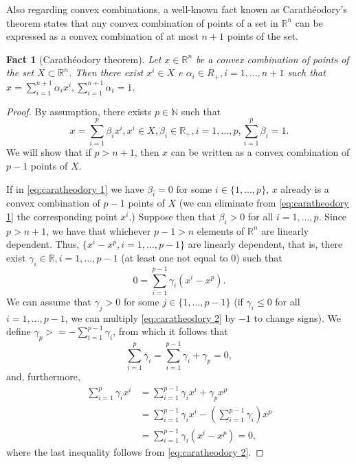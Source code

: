\documentclass[smallextended,numbook,nospthms]{svjour3}
\theoremstyle{plain}
\newtheorem{fact}[theorem]{Fact}
\theoremstyle{definition}
\def\RR{\mathds R}
\def\NN{\mathds N}
\begin{document}
Also regarding convex combinations, a well-known fact known as Carathéodory's theorem states that any convex combination of points of a set in $\RR^{n}$ can be expressed as a convex combination of at most $n+1$ points of the set.
\begin{fact}[Carathéodory theorem]\label{fact:caratheodory}
Let $x \in \RR^{n}$ be a convex combination of points of the set $X \subset \RR^{n}$. Then there exist $x^{i} \in X$ e $\alpha_{i} \in R_{+}, i=1, \ldots, n+1$
such that $x=\sum_{i=1}^{n+1} \alpha_{i} x^{i}, \sum_{i=1}^{n+1} \alpha_{i}=1$.
\end{fact}
\begin{proof}
	By assumption, there exists $p \in \NN$ such that
	\[
	x=\sum_{i=1}^{p} \beta_{i} x^{i}, x^{i} \in X, \beta_{i} \in \RR_{+}, i=1, \ldots, p, \sum_{i=1}^{p} \beta_{i}=1. \label{eq:caratheodory 1}
	\]
	We will show that if $p > n+1$, then $x$ can be written as a convex combination of $p-1$ points of $X$.
	
	If in \cref{eq:caratheodory 1} we have $\beta_{i}=0$ for some $i \in \{1,\ldots,p\}$, $x$ already is a convex combination of $p-1$ points of $X$ (we can eliminate from \cref{eq:caratheodory 1} the corresponding point $x^i$.) Suppose then that $\beta_{i}>0$ for all $i=1,\ldots,p$. Since $p>n+1$, we have that whichever $p-1>n$ elements of $\RR^n$ are linearly dependent. Thus, $\{x^i-x^p, i =1,\ldots,p-1\}$ are linearly dependent, that is, there exist $\gamma_{i} \in \RR, i=1,\ldots,p-1$ (at least one not equal to 0) such that
	\[
	0=\sum_{i=1}^{p-1} \gamma_{i}\left(x^{i}-x^{p}\right) \label{eq:caratheodory 2}.
	\]
	We can assume that $\gamma_{j}>0$ for some $j \in\{1, \ldots, p-1\}$ (if $\gamma_{i} \leq 0$ for all $i=1, \ldots, p-1$, we can multiply \cref{eq:caratheodory 2} by $-1$ to change signs). We define $\gamma_{p}>=-\sum_{i=1}^{p-1} \gamma_{i}$, from which it follows that
	\[
	\sum_{i=1}^{p} \gamma_{i}=\sum_{i=1}^{p-1} \gamma_{i}+\gamma_{p}=0, \label{eq:caratheodory 3}
	\]
	and, furthermore,
	\begin{align}
		\sum_{i=1}^{p} \gamma_{i} x^{i} &=\sum_{i=1}^{p-1} \gamma_{i} x^{i}+\gamma_{p} x^{p} \\
		&=\sum_{i=1}^{p-1} \gamma_{i} x^{i}-\left(\sum_{i=1}^{p-1} \gamma_{i}\right) x^{p} \\
		&=\sum_{i=1}^{p-1} \gamma_{i}\left(x^{i}-x^{p}\right)=0, \label{eq:caratheodory 4}
	\end{align}
	where the last inequality follows from \cref{eq:caratheodory 2}.
	

\end{proof}
\end{document}
